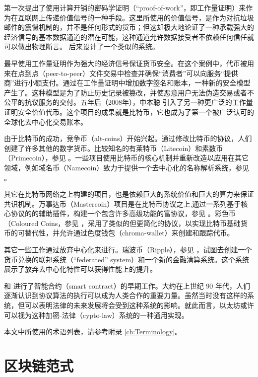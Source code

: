 \documentclass[9pt,oneside]{amsart}
\begin{document}
\begin{multicols}{2}
\cite{dwork92pricingvia} 第一次提出了使用计算开销的密码学证明（“proof-of-work”，即工作量证明）来作为在互联网上传递价值信号的一种手段。这里所使用的价值信号，是作为对抗垃圾邮件的震慑机制的，并不是任何形式的货币；但这却极大地论证了一种承载强大的经济信号的基本数据通道的潜在可能，这种通道允许数据接受者不依赖任何信任就可以做出物理断言。\cite{back2002hashcash} 后来设计了一个类似的系统。

\cite{vishnumurthy03karma:a} 最早使用工作量证明作为强大的经济信号保证货币安全。在这个案例中，代币被用来在点到点（peer-to-peer）文件交易中检查并确保“消费者”可以向服务“提供商”进行小额支付。通过在工作量证明中增加数字签名和账本，一种新的安全模型产生了。这种模型是为了防止历史记录被篡改，并使恶意用户无法伪造交易或者不公平的抗议服务的交付。五年后（2008年），中本聪 \cite{nakamoto2008bitcoin} 引入了另一种更广泛的工作量证明安全价值代币。这个项目的成果就是比特币，它也成为了第一个被广泛认可的全球化去中心化交易账本。

由于比特币的成功，竞争币（alt-coins）开始兴起。通过修改比特币的协议，人们创建了许多其他的数字货币。比较知名的有莱特币（Litecoin）和素数币（Primecoin），参见 \cite{sprankel2013technical} 。一些项目使用比特币的核心机制并重新改造以应用在其它领域，例如域名币（Namecoin）致力于提供一个去中心化的名称解析系统，参见 \cite{aron2012bitcoin} 。

其它在比特币网络之上构建的项目，也是依赖巨大的系统价值和巨大的算力来保证共识机制。万事达币（Mastercoin）项目是在比特币协议之上,通过一系列基于核心协议的的辅助插件，构建一个包含许多高级功能的富协议，参见 \cite{mastercoin2013willett} 。彩色币（Coloured Coins，参见 \cite{colouredcoins2012rosenfeld} ，采用了类似的但更简化的协议，以实现比特币基础货币的可替代性，并允许通过色度钱包（chroma-wallet）来创建和跟踪代币。

其它一些工作通过放弃中心化来进行。瑞波币（Ripple），参见 \cite{boutellier2014pirates} ，试图去创建一个货币兑换的联邦系统（“federated” system）和一个新的金融清算系统。这个系统展示了放弃去中心化特性可以获得性能上的提升。

\cite{szabo1997formalizing} 和 \cite{miller1997future} 进行了智能合约（smart contract）的早期工作。大约在上世纪 90 年代，人们逐渐认识到协议算法的执行可以成为人类合作的重要力量。虽然当时没有这样的系统，但可以表明法律的未来发展将会受到这种系统的影响。就此而言，以太坊或许可以视为这种加密-法律（cypto-law）系统的一种通用实现。

本文中所使用的术语列表，请参考附录 \ref{ch:Terminology}。

\section{区块链范式} \label{ch:overview}


\end{multicols}
\end{document}
